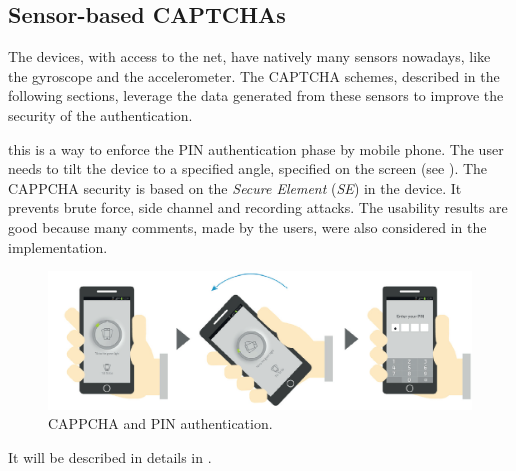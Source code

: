 \subsection{Sensor-based CAPTCHAs}
The devices, with access to the net, have natively many sensors nowadays, like the gyroscope and the accelerometer. The CAPTCHA schemes, described in the following sections, leverage the data generated from these sensors to improve the security of the authentication.
\begin{itemize}
{this is a way to enforce the PIN authentication phase by mobile phone\cite{CAPPCHA}. The user needs to tilt the device to a specified angle, specified on the screen (see ). The CAPPCHA security is based on the \textit{Secure Element} (\textit{SE}) in the device. It prevents brute force, side channel and recording attacks. The usability results are good because many comments, made by the users, were also considered in the implementation.
\begin{figure}[h]
     \centering
     \includegraphics[width=.8\linewidth]{Images/StateOfArt/CAPPCHA}
     \caption{\footnotesize{CAPPCHA and PIN authentication\cite{CAPPCHA}.}}\label{soa:CAPPCHA}
\end{figure}
}
{It will be described in details in .}
\end{itemize}

